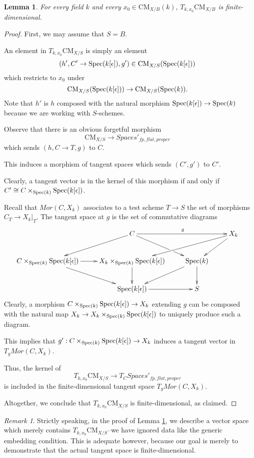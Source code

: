 \documentclass{stacks-project}
\theoremstyle{plain}
\newtheorem{lemma}[subsection]{Lemma}
\theoremstyle{definition}
\DeclareMathOperator{\Spec}{Spec}
\theoremstyle{remark}
\newtheorem{remark}[subsection]{Remark}
\numberwithin{equation}{subsection}
\def\Spec{\mathop{\rm Spec}}
\def\CMfunctor{\mathcal{C}\!{\it oh}}
\def\CMfunctor{\text{CM}}
\begin{document}
\begin{lemma}
	For every field $k$ and every $x_0\in \CMfunctor_{X/B}(k)$, $T_{k,x_0}\CMfunctor_{X/B}$ is finite-dimensional.
	\label{lemma-cm-tangent-space}
\end{lemma}
\begin{proof}
	First, we may assume that $S=B$.

	An element in $ T_{k,x_0}\CMfunctor_{X/S}$ is simply an element
	\[(h',C'\rightarrow \Spec(k[\epsilon]),g')\in \CMfunctor_{X/S}(\Spec(k[\epsilon]))\]
	which restricts to $x_0$ under 
	\[\CMfunctor_{X/S}(\Spec(k[\epsilon]))\rightarrow\CMfunctor_{X/S}(\Spec(k)).\]
	Note that $h'$ is $h$ composed with the natural morphism $\Spec(k[\epsilon])\rightarrow\Spec(k)$ because we are working with $S$-schemes.

	Observe that there is an obvious forgetful morphism
	\[\CMfunctor_{X/S}\rightarrow Spaces'_{fp,flat,proper}\]
	which sends $(h,C\rightarrow T,g)$ to $C$.

	This induces a morphism of tangent spaces which sends $(C',g')$ to $C'$.

	Clearly, a tangent vector is in the kernel of this morphism if and only if $C'\cong C\times_{\Spec(k)} \Spec(k[\epsilon])$.
	
	Recall that $Mor(C,X_k)$ associates to a test scheme $T\rightarrow S$ the set of morphisms $C_T\rightarrow X_k|_T$.
	The tangent space at $g$ is the set of commutative diagrams
	\[\xymatrix{
		&C\ar[rr]^{g}\ar[dr]|!{[d];[rr]}\hole\ar[dl] & & X_k\ar[dll]\ar[dl]\\
		C\times_{\Spec(k)}\Spec(k[\epsilon])\ar[r]\ar[dr]&X_k\times_{\Spec(k)}\Spec(k[\epsilon])\ar[d]& \Spec(k)\ar[dl]\ar[d] & \\
		&\Spec(k[\epsilon])\ar[r] & S&
	}\]
	Clearly, a morphism $C\times_{\Spec(k)}\Spec(k[\epsilon])\rightarrow X_k$ extending $g$ can be composed with the natural map $X_k\rightarrow X_k\times_{\Spec(k)}\Spec(k[\epsilon])$ to uniquely produce such a diagram.

	This implies that $g':C\times_{\Spec(k)}\Spec(k[\epsilon])\rightarrow X_k$ induces a tangent vector in $T_gMor(C,X_k)$.

	Thus, the kernel of
	\[T_{k,x_0}\CMfunctor_{X/S}\rightarrow T_{C}Spaces'_{fp,flat,proper}\]
	is included in the finite-dimensional tangent space $T_gMor(C,X_k)$.

	Altogether, we conclude that $T_{k,x_0}\CMfunctor_{X/S}$ is finite-dimensional, as claimed.
	\end{proof}
	\begin{remark}
		Strictly speaking, in the proof of Lemma \ref{lemma-cm-tangent-space}, we describe a vector space which merely contains $T_{k,x_0}\CMfunctor_{X/S}$--we have ignored data like the generic embedding condition.
		This is adequate however, because our goal is merely to demonstrate that the actual tangent space is finite-dimensional.
	\end{remark}
\end{document}
